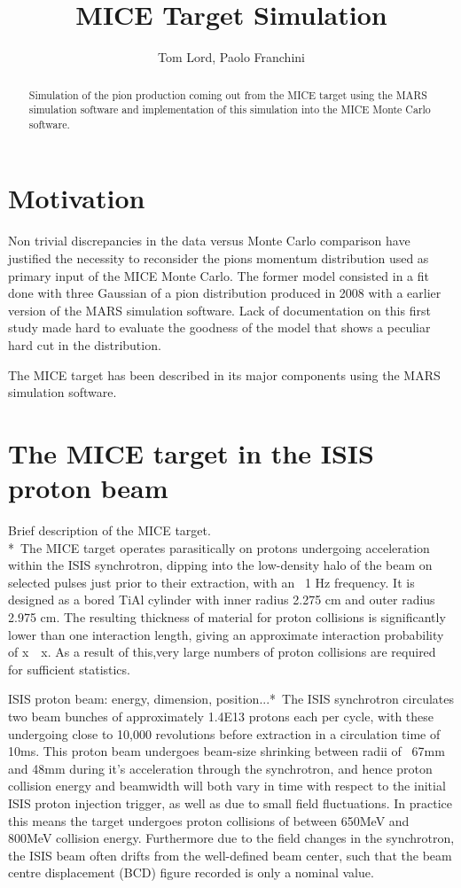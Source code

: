 \documentclass[a4paper,11pt]{article}
\title{MICE Target Simulation}
\author{Tom Lord, Paolo Franchini}
\begin{document}
\maketitle
\tableofcontents

\begin{abstract}
Simulation of the pion production coming out from the MICE target using the MARS simulation software and implementation of this simulation into the MICE Monte Carlo software.
\end{abstract}

\newpage

\section{Motivation}

Non trivial discrepancies in the data versus Monte Carlo comparison have justified the necessity to reconsider the pions momentum distribution used as primary input of the MICE Monte Carlo.
The former model consisted in a fit done with three Gaussian of a pion distribution produced in 2008 with a earlier version of the MARS simulation software. Lack of documentation on this first study made hard to evaluate the goodness of the model that shows a peculiar hard cut in the distribution.

The MICE target has been described in its major components using the MARS simulation software.
\section{The MICE target in the ISIS proton beam}

\*Brief description of the MICE target.\\*\
The MICE target operates parasitically on protons undergoing acceleration within the ISIS synchrotron, dipping into the low-density halo of the beam on selected pulses just prior to their extraction, with an ~1 Hz frequency. It is designed as a bored TiAl cylinder with inner radius 2.275 cm and outer radius 2.975 cm. The resulting thickness of material for proton collisions is significantly lower than one interaction length, giving an approximate interaction probability of x~~x. As a result of this,very large numbers of proton collisions are required for sufficient statistics. 

\*ISIS proton beam: energy, dimension, position...*\
The ISIS synchrotron circulates two beam bunches of approximately 1.4E13 protons each per cycle, with these undergoing close to 10,000 revolutions before extraction in a circulation time of 10ms. This proton beam undergoes beam-size shrinking between radii of ~67mm and 48mm during it's acceleration through the synchrotron, and hence proton collision energy and beamwidth will both vary in time with respect to the initial ISIS proton injection trigger, as well as due to small field fluctuations. In practice this means the target undergoes proton collisions of between 650MeV and 800MeV collision energy. Furthermore due to the field changes in the synchrotron, the ISIS beam often drifts from the well-defined beam center, such that the beam centre displacement (BCD) figure recorded is only a nominal value. 
\end{document}
